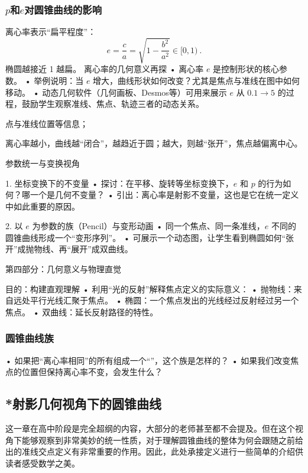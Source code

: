 \subsubsection{$p$和$e$对圆锥曲线的影响}

离心率表示“扁平程度”：
$$ e = \frac{c}{a} = \sqrt{1 - \frac{b^2}{a^2}} \in [0, 1) ~.$$
椭圆越接近 1 越扁。
离心率的几何意义再探
	•	离心率 $e$ 是控制形状的核心参数。
	•	举例说明：当 $e$ 增大，曲线形状如何改变？尤其是焦点与准线在图中如何移动。
	•	动态几何软件（几何画板、Desmos等）可用来展示 $e$ 从 $0.1 \to 5$ 的过程，鼓励学生观察准线、焦点、轨迹三者的动态关系。

点与准线位置等信息；

离心率越小，曲线越“闭合”，越趋近于圆；越大，则越“张开”，焦点越偏离中心。


参数统一与变换视角

1. 坐标变换下的不变量
	•	探讨：在平移、旋转等坐标变换下，$e$ 和 $p$ 的行为如何？哪一个是几何不变量？
	•	引出：离心率是射影不变量，这也是它在统一定义中如此重要的原因。

2. 以 $e$ 为参数的族（Pencil）与变形动画
	•	同一个焦点、同一条准线，$e$ 不同的圆锥曲线形成一个“变形序列”。
	•	可展示一个动态图，让学生看到椭圆如何“张开”成抛物线、再“展开”成双曲线。



第四部分：几何意义与物理直觉

目的：构建直观理解
	•	利用“光的反射”解释焦点定义的实际意义：
	•	抛物线：来自远处平行光线汇聚于焦点。
	•	椭圆：一个焦点发出的光线经过反射经过另一个焦点。
	•	双曲线：延长反射路径的特性。



\subsubsection{圆锥曲线族}

	•	如果把“离心率相同”的所有组成一个“”，这个族是怎样的？
	•	如果我们改变焦点的位置但保持离心率不变，会发生什么？

\subsection{*射影几何视角下的圆锥曲线}\label{sub_HsCsFD_1}

这一章在高中阶段是完全超纲的内容，大部分的老师甚至都不会提及。但在这个视角下能够观察到非常美妙的统一性质，对于理解圆锥曲线的整体为何会跟随之前给出的准线交点定义有非常重要的作用。因此，此处承接定义进行一些简单的介绍供读者感受数学之美。

